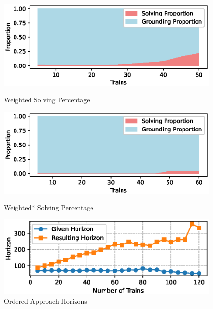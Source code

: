 \documentclass{llncs}
\begin{document}
\begin{multicols*}{2}
\begin{figure}[t]
    \begin{minipage}[t]{0.32\textwidth}
        \includegraphics[width=1\textwidth]{images/weighted_s.eps}
        \caption{Weighted Solving Percentage}
        \label{fig:weighted}
    \end{minipage}
    \begin{minipage}[t]{0.32\textwidth}
        \includegraphics[width=1\textwidth]{images/weighted_reduced_s.eps}
        \caption{Weighted* Solving Percentage}
        \label{fig:weighted*}
    \end{minipage}
    \begin{minipage}[t]{0.32\textwidth}
        \includegraphics[width=1\textwidth]{images/horizons.eps}
        \caption{Ordered Approach Horizons}
        \label{fig:horizon}
    \end{minipage}
\end{figure}


\end{multicols*}
\end{document}
